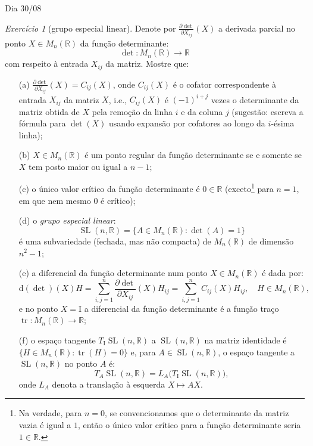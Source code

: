 \documentclass[oneside,11pt]{amsart}
\newcommand{\R}{\mathds R}
\newcommand{\dd}{\mathrm d}
\newcommand{\I}{\mathrm I}
\DeclareMathOperator{\SL}{SL}
\DeclareMathOperator{\tr}{tr}
\theoremstyle{remark}\newtheorem{exercise}{Exercício}[section]
\theoremstyle{plain}\newtheorem{teo}{Teorema}[section]
\theoremstyle{plain}\newtheorem{lem}[teo]{Lema}
\theoremstyle{plain}\newtheorem{prop}[teo]{Proposição}
\theoremstyle{definition}\newtheorem{defin}[teo]{Definição}
\theoremstyle{remark}\newtheorem{rem}[teo]{Observação}
\theoremstyle{definition}\newtheorem{example}[teo]{Exemplo}
\numberwithin{equation}{section}
\begin{document}
\begin{section}{Dia 30/08}
\begin{exercise}[grupo especial linear]\label{exe:SLnR}
Denote por $\frac{\partial\det}{\partial X_{ij}}(X)$ a derivada parcial no ponto $X\in M_n(\R)$ da função determinante:
\[\det:M_n(\R)\longrightarrow\R\]
com respeito à entrada $X_{ij}$ da matriz. Mostre que:
\begin{itemize}
\item[(a)] $\frac{\partial\det}{\partial X_{ij}}(X)=C_{ij}(X)$, onde $C_{ij}(X)$ é o cofator correspondente à entrada $X_{ij}$ da matriz $X$,
i.e., $C_{ij}(X)$ é $(-1)^{i+j}$ vezes o determinante da matriz obtida de $X$ pela remoção da linha $i$ e da coluna $j$
(sugestão: escreva a fórmula para $\det(X)$ usando expansão por cofatores ao longo da $i$-ésima linha);
\item[(b)] $X\in M_n(\R)$ é um ponto regular da função determinante se e somente se $X$ tem posto maior ou igual a $n-1$;
\item[(c)] o único valor crítico da função determinante é $0\in\R$ (exceto\footnote{%
Na verdade, para $n=0$, se convencionamos que o determinante da matriz vazia é igual a $1$, então o único valor crítico para a função
determinante seria $1\in\R$.} para $n=1$, em que nem mesmo $0$ é crítico);
\item[(d)] o {\em grupo especial linear}:
\[\SL(n,\R)=\big\{A\in M_n(\R):\det(A)=1\big\}\]
é uma subvariedade (fechada, mas não compacta) de $M_n(\R)$ de dimensão $n^2-1$;
\item[(e)] a diferencial da função determinante num ponto $X\in M_n(\R)$ é dada por:
\[\dd(\det)(X)H=\sum_{i,j=1}^n\frac{\partial\det}{\partial X_{ij}}(X)H_{ij}=\sum_{i,j=1}^nC_{ij}(X)H_{ij},\quad H\in M_n(\R),\]
e no ponto $X=\I$ a diferencial da função determinante é a função traço $\tr:M_n(\R)\to\R$;
\item[(f)] o espaço tangente $T_\I\!\SL(n,\R)$ a $\SL(n,\R)$ na matriz identidade é $\big\{H\in M_n(\R):\tr(H)=0\big\}$
e, para $A\in\SL(n,\R)$, o espaço tangente a $\SL(n,\R)$ no ponto $A$ é:
\[T_A\SL(n,\R)=L_A\big(T_\I\!\SL(n,\R)\big),\]
onde $L_A$ denota a translação à esquerda $X\mapsto AX$.
\end{itemize}
\end{exercise}


\end{section}
\end{document}
